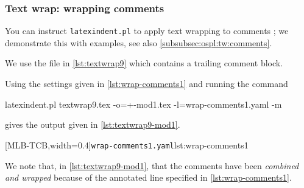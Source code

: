 \subsubsection{Text wrap: wrapping comments}\label{subsubsec:tw:comments}
 You can instruct \texttt{latexindent.pl} to apply text wrapping to comments
 ; we demonstrate this with examples,
 see also \cref{subsubsec:ospl:tw:comments}.  

 \begin{example}
 We use the file in \cref{lst:textwrap9} which contains a trailing comment block.


 Using the settings given in \cref{lst:wrap-comments1} and running the command

 \begin{commandshell}
latexindent.pl textwrap9.tex -o=+-mod1.tex -l=wrap-comments1.yaml -m
   \end{commandshell}

 gives the output given in \cref{lst:textwrap9-mod1}.

 \begin{cmhtcbraster}[raster columns=2,
   raster left skip=-1.5cm,
   raster right skip=-0cm,
   raster column skip=.06\linewidth]
  [MLB-TCB,width=0.4\linewidth]{\texttt{wrap-comments1.yaml}}{lst:wrap-comments1}
 \end{cmhtcbraster}

 We note that, in \cref{lst:textwrap9-mod1}, that the comments have been \emph{combined
 and wrapped} because of the annotated line specified in \cref{lst:wrap-comments1}.
 \end{example}

